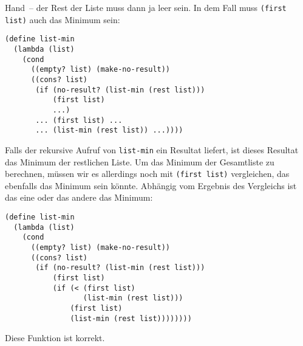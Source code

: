 Hand~-- der Rest der Liste muss dann ja leer sein.  In dem Fall muss
\lstinline{(first list)} auch das Minimum sein:
%
\begin{lstlisting}
(define list-min
  (lambda (list)
    (cond
      ((empty? list) (make-no-result))
      ((cons? list)
       (if (no-result? (list-min (rest list)))
           (first list)
           ...)
       ... (first list) ...
       ... (list-min (rest list)) ...))))
\end{lstlisting}
%
Falls der rekursive Aufruf von \lstinline{list-min} ein Resultat
liefert, ist dieses Resultat das Minimum der restlichen Liste.
Um das Minimum der Gesamtliste zu berechnen, müssen wir es allerdings
noch mit \lstinline{(first list)} vergleichen, das ebenfalls das
Minimum sein könnte.  Abhängig vom Ergebnis des Vergleichs ist das
eine oder das andere das Minimum:
%
\begin{lstlisting}
(define list-min
  (lambda (list)
    (cond
      ((empty? list) (make-no-result))
      ((cons? list)
       (if (no-result? (list-min (rest list)))
           (first list)
           (if (< (first list)
                  (list-min (rest list)))
               (first list)
               (list-min (rest list))))))))
\end{lstlisting}
%
Diese Funktion ist korrekt.

